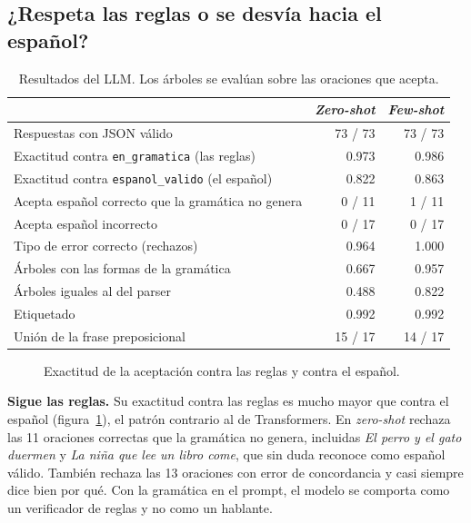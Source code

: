 \subsection{¿Respeta las reglas o se desvía hacia el español?}

\begin{table}[h]
  \centering
  \small
  \begin{tabular}{lrr}
    \toprule
    & \emph{Zero-shot} & \emph{Few-shot} \\
    \midrule
    Respuestas con JSON válido & 73 / 73 & 73 / 73 \\
    Exactitud contra \texttt{en\_gramatica} (las reglas) & 0.973 & 0.986 \\
    Exactitud contra \texttt{espanol\_valido} (el español) & 0.822 & 0.863 \\
    Acepta español correcto que la gramática no genera & 0 / 11 & 1 / 11 \\
    Acepta español incorrecto & 0 / 17 & 0 / 17 \\
    Tipo de error correcto (rechazos) & 0.964 & 1.000 \\
    Árboles con las formas de la gramática & 0.667 & 0.957 \\
    Árboles iguales al del parser & 0.488 & 0.822 \\
    Etiquetado & 0.992 & 0.992 \\
    Unión de la frase preposicional & 15 / 17 & 14 / 17 \\
    \bottomrule
  \end{tabular}
  \caption{Resultados del LLM. Los árboles se evalúan sobre las oraciones que acepta.}
  \label{tab:llm_resumen}
\end{table}

\begin{figure}[h]
  \centering
  \caption{Exactitud de la aceptación contra las reglas y contra el español.}
  \label{fig:llm_reglas_vs_espanol}
\end{figure}

\textbf{Sigue las reglas.} Su exactitud contra las reglas es mucho mayor que contra el español
(figura~\ref{fig:llm_reglas_vs_espanol}), el patrón contrario al de Transformers. En
\emph{zero-shot} rechaza las 11 oraciones correctas que la gramática no genera, incluidas
\emph{El perro y el gato duermen} y \emph{La niña que lee un libro come}, que sin duda reconoce
como español válido. También rechaza las 13 oraciones con error de concordancia y casi siempre
dice bien por qué. Con la gramática en el prompt, el modelo se comporta como un verificador de
reglas y no como un hablante.

